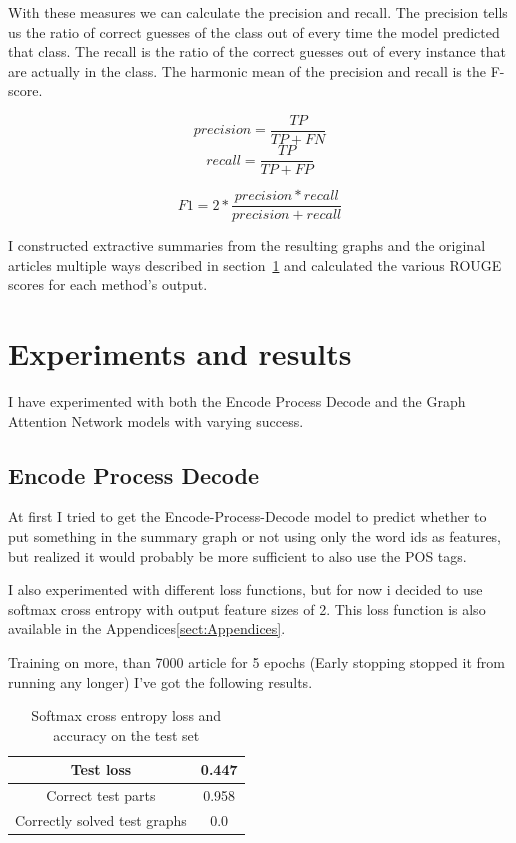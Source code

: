 With these measures we can calculate the precision and recall. The precision tells us the ratio of correct guesses of the class out of every time the model predicted that class. The recall is the ratio of the correct guesses out of every instance that are actually in the class. The harmonic mean of the precision and recall is the F-score.

\[precision = \frac{TP}{TP + FN}\]
\[recall = \frac{TP}{TP + FP}\]

\[F1 = 2 * \frac{precision * recall}{precision + recall}\]

I constructed extractive summaries from the resulting graphs and the original articles multiple ways described in section~\ref{ssect:ExperimnetsAndResults} and calculated the various ROUGE scores for each method's output.

\section{Experiments and results}\label{ssect:ExperimnetsAndResults}
I have experimented with both the Encode Process Decode and the Graph Attention Network models with varying success.
\subsection{Encode Process Decode}
At first I tried to get the Encode-Process-Decode model to predict whether to put something in the summary graph or not using only the word ids as features, but realized it would probably be more sufficient to also use the POS tags.

I also experimented with different loss functions, but for now i decided to use softmax cross entropy with output feature sizes of 2. This loss function is also available in the Appendices\ref{sect:Appendices}.

Training on more, than 7000 article for 5 epochs (Early stopping stopped it from running any longer) I've got the following results.
\begin{table}[!h]
	\centering
	\begin{tabular}{| c | c |}
		\hline
		Test loss & 0.447 \\ \hline
		Correct test parts & 0.958 \\ \hline
		Correctly solved test graphs & 0.0 \\ \hline
	\end{tabular}
	\caption{Softmax cross entropy loss and accuracy on the test set}
\end{table}

